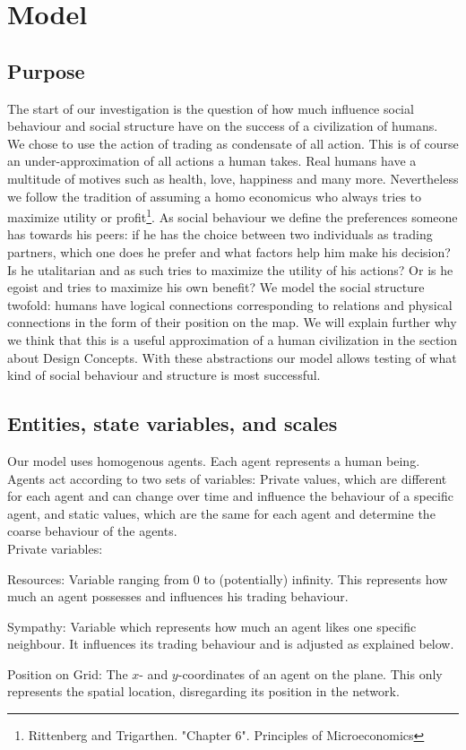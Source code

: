 \documentclass{JASSS}
\begin{document}
\section{Model}
\subsection{Purpose}
The start of our investigation is the question of how much influence social behaviour and social structure have on the success of a civilization of humans. We chose to use the action of trading as condensate of all action. This is of course an under-approximation of all actions a human takes. Real humans have a multitude of motives such as health, love, happiness and many more. Nevertheless we follow the tradition of assuming a homo economicus who always tries to maximize utility or profit\footnote{Rittenberg and Trigarthen. "Chapter 6". Principles of Microeconomics}. As social behaviour we define the preferences someone has towards his peers: if he has the choice between two individuals as trading partners, which one does he prefer and what factors help him make his decision? Is he utalitarian and as such tries to maximize the utility of his actions? Or is he egoist and tries to maximize his own benefit? We model the social structure twofold: humans have logical connections corresponding to relations and physical connections in the form of their position on the map. We will explain further why we think that this is a useful approximation of a human civilization in the section about Design Concepts. With these abstractions our model allows testing of what kind of social behaviour and structure is most successful.


\subsection{Entities, state variables, and scales}
Our model uses homogenous agents. Each agent represents a human being. Agents act according to two sets of variables: Private values, which are different for each agent and can change over time and influence the behaviour of a specific agent, and static values, which are the same for each agent and determine the coarse behaviour of the agents.\\

Private variables:
\begin{description*}
	\item[Resources:]
		Variable ranging from 0 to (potentially) infinity. This represents how much an agent possesses and influences his trading behaviour.

	\item[Sympathy:]
		Variable which represents how much an agent likes one specific neighbour. It influences its trading behaviour and is adjusted as explained below.

	\item[Position on Grid:]
		The $x$- and $y$-coordinates of an agent on the plane. This only represents the spatial location, disregarding its position in the network.
\end{description*}
\end{document}
